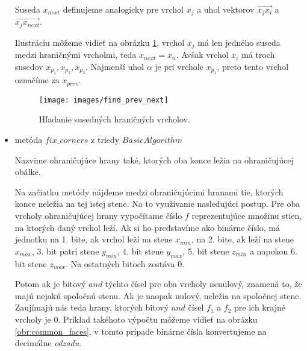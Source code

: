 \begin{itemize}
{                Suseda $x_{next}$ definujeme analogicky pre vrchol $x_j$ a uhol vektorov 
                $\overrightarrow{x_j x_i}$ a $\overrightarrow{x_j x_{next}}$.

                Ilustráciu môžeme vidieť na obrázku \ref{obr:find_prev_next}, vrchol $x_j$
                má len jedného suseda medzi hraničnými vrcholmi, teda $x_{next} = x_n$. 
                Avšak vrchol $x_i$ má troch
                susedov $x_{p_1}, x_{p_2}, x_{p_3}$. Najmenší uhol $\alpha$ je pri vrchole $x_{p_1}$,
                preto tento vrchol označíme za $x_{prev}$.

                \begin{figure}
                    \centerline{\texttt{[image: images/find\_prev\_next]}}
                    \caption[Hľadanie susedných hraničných vrcholov]
                    {Hľadanie susedných hraničných vrcholov.}
                    \label{obr:find_prev_next}
                \end{figure}
    }
    \item{
        metóda $fix\_corners$ z triedy $BasicAlgorithm$

        Nazvime ohraničujúce hrany také, ktorých oba konce ležia na ohraničujúcej obálke.
                
                Na začiatku metódy nájdeme medzi ohraničujúcimi hranami tie, ktorých konce neležia
                na tej istej stene. Na to využívame nasledujúci postup. Pre oba vrcholy ohraničujúcej 
                hrany vypočítame číslo $f$ reprezentujúce množinu stien, na ktorých daný vrchol leží. 
                Ak si ho predstavíme ako binárne číslo, má jednotku na 1. bite, ak vrchol leží na stene 
                $x_{min}$, na 2. bite, ak leží na stene $x_{max}$, 3. bit patrí stene $y_{min}$, 4. bit
                stene $y_{max}$, 5. bit stene $z_{min}$ a napokon 6. bit stene $z_{max}$. Na ostatných 
                bitoch zostáva 0. 
                
                Potom ak je bitový $and$ týchto čísel pre oba vrcholy nenulový, znamená
                to, že majú nejakú spoločnú stenu. Ak je naopak nulový, neležia na spoločnej stene.
                Zaujímajú nás teda hrany, ktorých bitový $and$ čísel $f_1$ a $f_2$ pre ich krajné 
                vrcholy je 0. Príklad takéhoto výpočtu môžeme vidieť na obrázku \ref{obr:common_faces}, 
                v tomto prípade binárne čísla konvertujeme na decimálne \textit{odzadu}.

}
\end{itemize}
